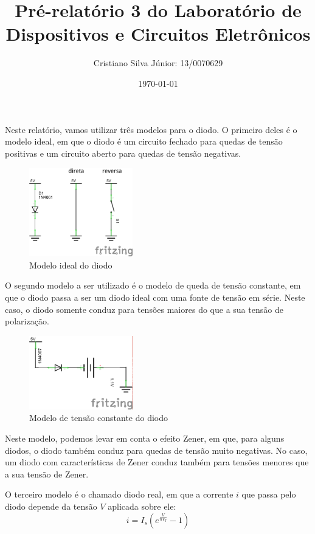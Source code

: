 \documentclass[12pt, a4paper, twoside]{article}
\begin{document}
\title{Pré-relatório 3 do Laboratório de Dispositivos e Circuitos Eletrônicos}
\author{Cristiano Silva Júnior: 13/0070629}
\date{\today}
\maketitle

Neste relatório, vamos utilizar três modelos para o diodo. O primeiro deles é o modelo
ideal, em que o diodo é um circuito fechado para quedas de tensão positivas e um
circuito aberto para quedas de tensão negativas.

\begin{figure}
    \centering
    \includegraphics[width=0.4\textwidth]{figs/diode.png}
    \caption{Modelo ideal do diodo}
\end{figure}

O segundo modelo a ser utilizado é o modelo de queda de tensão constante, em que o
diodo passa a ser um diodo ideal com uma fonte de tensão em série. Neste caso, o diodo
somente conduz para tensões maiores do que a sua tensão de polarização.

\begin{figure}
    \centering
    \includegraphics[width=0.4\textwidth]{figs/diode2.png}
    \caption{Modelo de tensão constante do diodo}
\end{figure}

Neste modelo, podemos levar em conta o efeito Zener, em que, para alguns diodos, o diodo
também conduz para quedas de tensão muito negativas. No caso, um diodo com
características de Zener conduz também para tensões menores que a sua tensão de Zener.

O terceiro modelo é o chamado diodo real, em que a corrente $i$ que passa pelo diodo
depende da tensão $V$ aplicada sobre ele:
$$i = I_s\left( e^{\frac{V}{nV_T}} - 1 \right)$$
\end{document}
